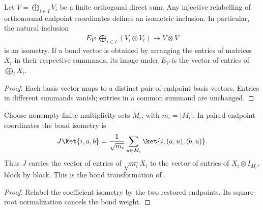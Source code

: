 \begin{lemma}%
    \label{lem:peps_matching_sector_bond_inclusion}
    \leanok
    Let $V=\bigoplus_{i\in I}V_i$ be a finite orthogonal direct sum.
    Any injective relabelling of orthonormal endpoint coordinates defines
    an isometric inclusion. In particular, the natural inclusion
    \begin{align}
        E_V:\bigoplus_{i\in I}(V_i\otimes V_i)
        \longrightarrow V\otimes V
    \end{align}
    is an isometry. If a bond vector is obtained by arranging the entries
    of matrices $X_i$ in their respective summands, its image under $E_V$
    is the vector of entries of $\bigoplus_i X_i$.
\end{lemma}

\begin{proof}\leanok
    Each basis vector maps to a distinct pair of endpoint basis vectors.
    Entries in different summands vanish; entries in a common summand
    are unchanged.
\end{proof}

\begin{definition}%
    \label{def:peps_multiplicity_block_bond_matrix}
    \leanok
    Choose nonempty finite multiplicity sets $M_i$, with $m_i=|M_i|$.
    In paired endpoint coordinates the bond isometry is
    \begin{align}
        J\ket{i,a,b}=\frac{1}{\sqrt{m_i}}
        \sum_{u\in M_i}\ket{i,(a,u),(b,u)}.
    \end{align}
    Thus $J$ carries the vector of entries of $\sqrt{m_i}X_i$ to the
    vector of entries of $X_i\otimes I_{M_i}$, block by block.
    This is the bond transformation of
    \cite[Section~7]{Schuch2010PEPS}.
\end{definition}

\begin{proof}\leanok
    Relabel the coefficient isometry by the two restored endpoints.
    Its square-root normalization cancels the bond weight.
\end{proof}

